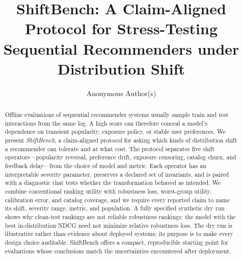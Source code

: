 \usepackage{amsmath}
\usepackage{booktabs}
\usepackage{enumitem}
\usepackage{microtype}

\renewcommand\footnotetextcopyrightpermission[1]{}


\title[ShiftBench]{ShiftBench: A Claim-Aligned Protocol for Stress-Testing
Sequential Recommenders under Distribution Shift}

\author{Anonymous Author(s)}

\begin{abstract}
Offline evaluations of sequential recommender systems usually sample train and
test interactions from the same log.  A high score can therefore conceal a
model's dependence on transient popularity, exposure policy, or stable user
preferences.  We present \emph{ShiftBench}, a claim-aligned protocol for asking
which kinds of distribution shift a recommender can tolerate and at what cost.
The protocol separates five shift operators---popularity reversal, preference
drift, exposure censoring, catalog churn, and feedback delay---from the choice
of model and metric.  Each operator has an interpretable severity parameter,
preserves a declared set of invariants, and is paired with a diagnostic that
tests whether the transformation behaved as intended.  We combine conventional
ranking utility with robustness loss, worst-group utility, calibration error,
and catalog coverage, and we require every reported claim to name its shift,
severity range, metric, and population.  A fully specified synthetic dry run
shows why clean-test rankings are not reliable robustness rankings: the model
with the best in-distribution NDCG need not minimize relative robustness loss.
The dry run is illustrative rather than evidence about deployed systems; its
purpose is to make every design choice auditable.  ShiftBench offers a compact,
reproducible starting point for evaluations whose conclusions match the
uncertainties encountered after deployment.
\end{abstract}

